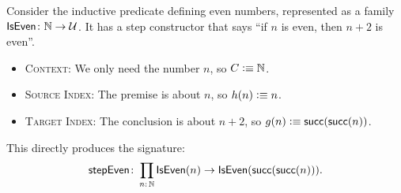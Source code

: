 \begin{xmpl}
    Consider the inductive predicate defining even numbers, represented as a family $\fun{IsEven}\colon\N\to\univ$. It has a step constructor that says ``if $n$ is even, then $n+2$ is even''.
    \begin{itemize}
        \item \textsc{Context:} We only need the number $n$, so $C\mathrel{\vcentcolon}\equiv\mathbb{N}$.
        
        \item \textsc{Source Index:} The premise is about $n$, so $h(n)\mathrel{\vcentcolon}\equiv n$.
        
        \item \textsc{Target Index:} The conclusion is about $n+2$, so $g(n)\mathrel{\vcentcolon}\equiv\mathsf{succ}(\mathsf{succ}(n))$.
    \end{itemize}
    This directly produces the signature:
    \[
        \fun{stepEven}\colon\prod_{n\colon\N}
            \fun{IsEven}(n)
            \to
            \fun{IsEven}(\fun{succ}(\fun{succ}(n))).
    \]
\end{xmpl}


